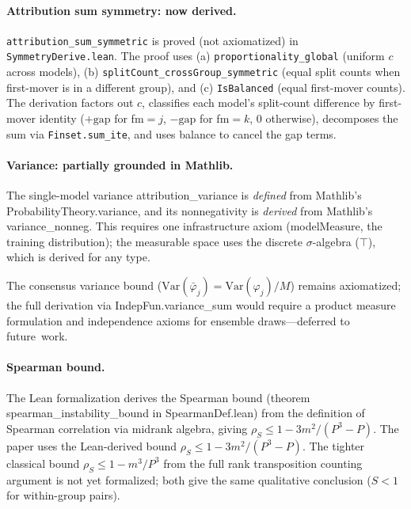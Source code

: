 \documentclass{jmlr}
\newcommand{\Var}{\mathrm{Var}}
\begin{document}
\paragraph{Attribution sum symmetry: now derived.}
\texttt{attribution\_sum\_symmetric} is proved (not axiomatized) in \texttt{SymmetryDerive.lean}. The proof uses (a) \texttt{proportionality\_global} (uniform $c$ across models), (b) \texttt{splitCount\_crossGroup\_symmetric} (equal split counts when first-mover is in a different group), and (c) \texttt{IsBalanced} (equal first-mover counts). The derivation factors out $c$, classifies each model's split-count difference by first-mover identity ($+\text{gap}$ for fm$=j$, $-\text{gap}$ for fm$=k$, $0$ otherwise), decomposes the sum via \texttt{Finset.sum\_ite}, and uses balance to cancel the gap terms.

\paragraph{Variance: partially grounded in Mathlib.}
\begin{sloppypar}
The single-model variance \textsf{attribution\_variance} is \emph{defined} from
Mathlib's \textsf{ProbabilityTheory.variance}, and its nonnegativity is \emph{derived} from Mathlib's \textsf{variance\_nonneg}.
This requires one infrastructure axiom (\textsf{modelMeasure}, the training distribution); the measurable space uses the discrete $\sigma$-algebra ($\top$), which is derived for any type.
\end{sloppypar}

The consensus variance bound ($\Var(\bar\varphi_j) = \Var(\varphi_j)/M$) remains axiomatized; the full derivation via \textsf{IndepFun.variance\_sum} would require a product measure formulation and independence axioms for ensemble draws---deferred to future~work.

\paragraph{Spearman bound.}
The Lean formalization derives the Spearman bound (theorem \textsf{spearman\_instability\_bound} in \textsf{SpearmanDef.lean}) from the definition of Spearman correlation via midrank algebra, giving
$\rho_S \leq 1 - 3m^2/(P^3{-}P)$.
The paper uses the Lean-derived bound $\rho_S \leq 1 - 3m^2/(P^3{-}P)$. The tighter classical bound $\rho_S \leq 1 - m^3/P^3$ from the full rank transposition counting argument is not yet formalized; both give the same qualitative conclusion ($S < 1$ for within-group pairs).
\end{document}
